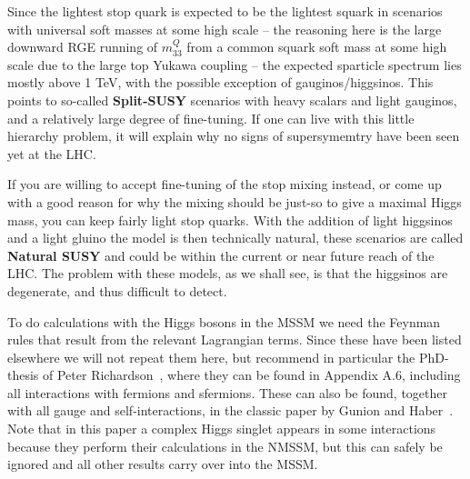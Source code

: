 \documentclass[notes.tex]{subfiles}
\begin{document}
Since the lightest stop quark is expected to be the lightest squark in scenarios with universal soft masses at some high scale -- the reasoning here is the large downward RGE running of $m_{33}^Q$ from a common squark soft mass at some high scale due to the large top Yukawa coupling -- the expected sparticle spectrum lies mostly above 1 TeV, with the possible exception of gauginos/higgsinos. This points to so-called {\bf Split-SUSY} scenarios with heavy scalars and light gauginos, and a relatively large degree of fine-tuning. If one can live with this little hierarchy problem, it will explain why no signs of supersymemtry have been seen yet at the LHC. 

If you are willing to accept fine-tuning of the stop mixing instead, or come up with a good reason for why the mixing should be just-so to give a maximal Higgs mass, you can keep fairly light stop quarks. With the addition of light higgsinos and a light gluino the model is then technically natural, these scenarios are called {\bf Natural SUSY} and could be within the current or near future reach of the LHC. The problem with these models, as we shall see, is that the higgsinos are degenerate, and thus difficult to detect.


To do calculations with the Higgs bosons in the MSSM we need the Feynman rules that result from the relevant Lagrangian terms. Since these have been listed elsewhere we will not repeat them here, but recommend in particular the PhD-thesis of Peter Richardson~\cite{Richardson:2000nt}, where they can be found in Appendix A.6, including all interactions with fermions and sfermions. These can also be found, together with all gauge and self-interactions, in the classic paper by Gunion and Haber~\cite{Gunion:1984yn}. Note that in this paper a complex Higgs singlet appears in some interactions because they perform their calculations in the NMSSM, but this can safely be ignored and all other results carry over into the MSSM.


\end{document}

